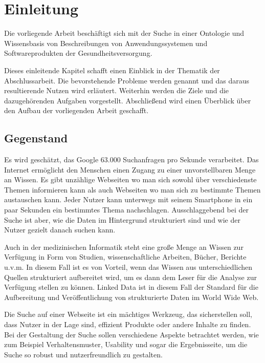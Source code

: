 \chapter{Einleitung}\label{ch:introduction}

Die vorliegende Arbeit beschäftigt sich mit der Suche in einer Ontologie und Wissensbasis von Beschreibungen von Anwendungssystemen und Softwareprodukten der Gesundheitsversorgung.

Dieses einleitende Kapitel schafft einen Einblick in der Thematik der Abschlussarbeit. Die bevorstehende Probleme werden genannt und das daraus resultierende Nutzen wird erläutert. Weiterhin werden die Ziele und die dazugehörenden Aufgaben vorgestellt. Abschließend wird einen Überblick über den Aufbau der vorliegenden Arbeit geschafft.

\section{Gegenstand}\label{sec:gegenstand}
Es wird geschätzt, das Google 63.000 Suchanfragen pro Sekunde verarbeitet. Das Internet ermöglicht den Menschen einen Zugang zu einer unvorstellbaren Menge an Wissen. Es gibt unzählige Webseiten wo man sich sowohl über verschiedenste Themen informieren kann als auch Webseiten wo man sich zu bestimmte Themen austauschen kann. Jeder Nutzer kann unterwegs mit seinem Smartphone in ein paar Sekunden ein bestimmtes Thema nachschlagen. Ausschlaggebend bei der Suche ist aber, wie die Daten im Hintergrund strukturiert sind und wie der Nutzer gezielt danach suchen kann.

Auch in der medizinischen Informatik steht eine große Menge an Wissen zur Verfügung in Form von Studien, wissenschaftliche Arbeiten, Bücher, Berichte u.v.m. In diesem Fall ist es von Vorteil, wenn das Wissen aus unterschiedlichen Quellen strukturiert aufbereitet wird, um es dann dem Leser für die Analyse zur Verfügung stellen zu können. Linked Data ist in diesem Fall der Standard für die Aufbereitung und Veröffentlichung von strukturierte Daten im World Wide Web. 

Die Suche auf einer Webseite ist ein mächtiges Werkzeug, das sicherstellen soll, dass Nutzer in der Lage sind, effizient Produkte oder andere Inhalte zu finden. Bei der Gestaltung der Suche sollen verschiedene Aspekte betrachtet werden, wie zum Beispiel Verhaltensmuster, Usability und sogar die Ergebnisseite, um die Suche so robust und nutzerfreundlich zu gestalten.

